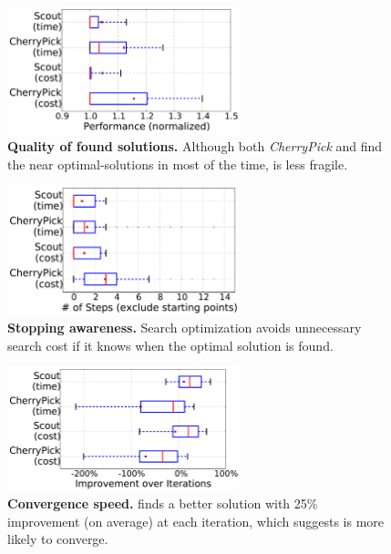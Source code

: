 \begin{figure}[!htbp]
\centering
\includegraphics[width=0.6\textwidth]{figures/single_fragility.pdf}
\caption{\small{\textbf{Quality of found solutions.}
    Although both \emph{CherryPick} and \scout find the near optimal-solutions in most of the time,
    \scout is less fragile.}
}
\label{fig:single_fragility}
\end{figure}

\begin{figure}
\centering
\includegraphics[width=0.6\textwidth]{figures/single_stopping_awareness.pdf}
\caption{\small{\textbf{Stopping awareness.}
    Search optimization avoids unnecessary search cost if it knows when the optimal solution is found.
    }}
\label{fig:single_startingpoint}

\end{figure}

\begin{figure}
\centering
\includegraphics[width=0.6\textwidth]{figures/single_convergence.pdf}
\caption{\small{\textbf{Convergence speed.}
    \scout finds a better solution with 25\% improvement (on average) at each iteration, which suggests \scout is more likely to 
    converge.}}
\label{fig:search_convergence}
\end{figure}


